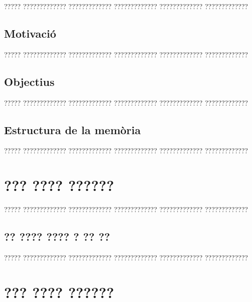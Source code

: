 \documentclass[11pt,spanish,listoffigures,listoftables]{tfgetsinf}
\begin{document}
????? ????????????? ????????????? ????????????? ????????????? ?????????????

\section{Motivaci\'o}

????? ????????????? ????????????? ????????????? ????????????? ????????????? 

\section{Objectius}

????? ????????????? ????????????? ????????????? ????????????? ?????????????

\section{Estructura de la mem\`oria}

????? ????????????? ????????????? ????????????? ????????????? ????????????? 




\chapter{??? ???? ??????}

????? ????????????? ????????????? ????????????? ????????????? ?????????????

\section{?? ???? ???? ? ?? ??}

????? ????????????? ????????????? ????????????? ????????????? ?????????????

\chapter{??? ???? ??????}
\end{document}
